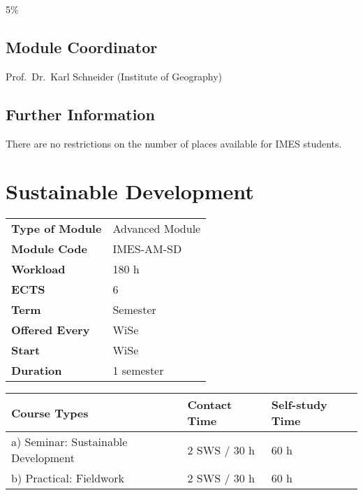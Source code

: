 \documentclass[
  letterpaper,
  10pt,
  openany]{book}
\begin{document}

5\%

\section*{Module Coordinator}\label{module-coordinator}


Prof.~Dr.~Karl Schneider (Institute of Geography)

\section*{Further Information}\label{further-information}


There are no restrictions on the number of places available for IMES
students.

\chapter*{Sustainable Development}\label{sustainable-development}


\begin{longtable}[]{@{}ll@{}}
\toprule\noalign{}
\endhead
\bottomrule\noalign{}
\endlastfoot
\textbf{Type of Module} & Advanced Module \\
\textbf{Module Code} & IMES-AM-SD \\
\textbf{Workload} & 180 h \\
\textbf{ECTS} & 6 \\
\textbf{Term} & Semester \\
\textbf{Offered Every} & WiSe \\
\textbf{Start} & WiSe \\
\textbf{Duration} & 1 semester \\
\end{longtable}

\begin{longtable}[]{@{}lll@{}}
\toprule\noalign{}
Course Types & Contact Time & Self-study Time \\
\midrule\noalign{}
\endhead
\bottomrule\noalign{}
\endlastfoot
a) Seminar: Sustainable Development & 2 SWS / 30 h & 60 h \\
b) Practical: Fieldwork & 2 SWS / 30 h & 60 h \\
\end{longtable}
\end{document}
